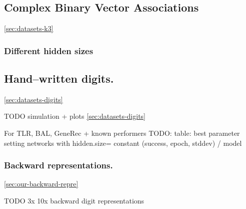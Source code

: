 \subsection{Complex Binary Vector Associations}
\ref{sec:datasets-k3} 


\subsubsection{Different hidden sizes} 

\subsection{Hand--written digits.}
\ref{sec:datasets-digits} 

TODO simulation + plots \ref{sec:datasets-digits} 

For TLR, BAL, GeneRec + known performers 
TODO: table: best parameter setting networks with hidden.size= constant (success, epoch, stddev) / model \\

\subsubsection{Backward representations.} 
\ref{sec:our-backward-repre} 

TODO 3x 10x backward digit representations 

